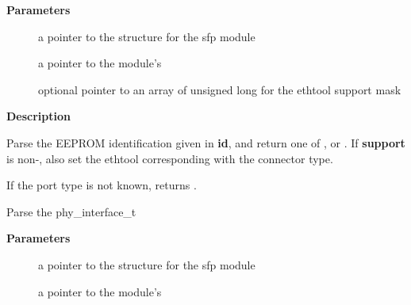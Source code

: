 \documentclass[a4paper,8pt,english]{sphinxmanual}
\begin{document}
\textbf{Parameters}
\begin{description}
\item[{}] \leavevmode
a pointer to the {\hyperref[networking/kapi:c.sfp_bus]{\emph{}}} structure for the sfp module

\item[{}] \leavevmode
a pointer to the module's {\hyperref[networking/kapi:c.sfp_eeprom_id]{\emph{}}}

\item[{}] \leavevmode
optional pointer to an array of unsigned long for the
ethtool support mask

\end{description}

\textbf{Description}

Parse the EEPROM identification given in \textbf{id}, and return one of
,  or . If \textbf{support} is non-,
also set the ethtool  corresponding with
the connector type.

If the port type is not known, returns .

\begin{fulllineitems}
\label{networking/kapi:c.sfp_parse_interface}
Parse the phy\_interface\_t

\end{fulllineitems}


\textbf{Parameters}
\begin{description}
\item[{}] \leavevmode
a pointer to the {\hyperref[networking/kapi:c.sfp_bus]{\emph{}}} structure for the sfp module

\item[{}] \leavevmode
a pointer to the module's {\hyperref[networking/kapi:c.sfp_eeprom_id]{\emph{}}}

\end{description}
\end{document}
